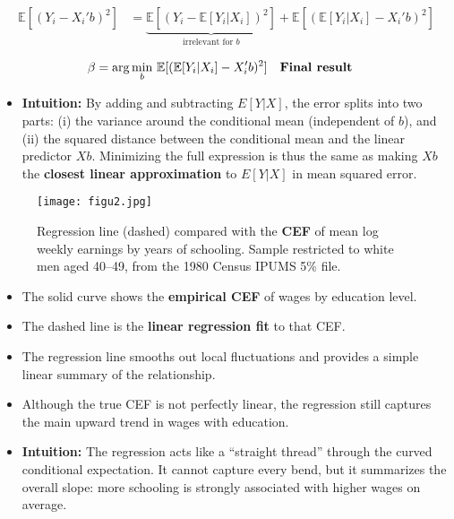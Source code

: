 \documentclass[12pt]{article}
\begin{document}
\begin{align}
\mathbb{E}[(Y_i - X_i'b)^2] 
   &= \underbrace{\mathbb{E}[(Y_i - \mathbb{E}[Y_i|X_i])^2]}_{\text{irrelevant for $b$}} 
   + \mathbb{E}[(\mathbb{E}[Y_i|X_i] - X_i'b)^2] 
\end{align}

\begin{align}
\beta &= \arg \min_b \, \mathbb{E}[(\mathbb{E}[Y_i|X_i] - X_i'b)^2] && \text{\textbf{Final result}} 
\end{align}

\begin{itemize}
    \item \textbf{Intuition:} By adding and subtracting $E[Y|X]$, the error splits into two parts:  
    (i) the variance around the conditional mean (independent of $b$), and  
    (ii) the squared distance between the conditional mean and the linear predictor $Xb$.  
    Minimizing the full expression is thus the same as making $Xb$ the \textbf{closest linear approximation} to $E[Y|X]$ in mean squared error.
\end{itemize}

\begin{figure}[H]
    \centering
    \texttt{[image: figu2.jpg]} %
    \caption*{Regression line (dashed) compared with the \textbf{CEF} of mean log weekly earnings by years of schooling. 
    Sample restricted to white men aged 40--49, from the 1980 Census IPUMS 5\% file.}
\end{figure}

\begin{itemize}
    \item The solid curve shows the \textbf{empirical CEF} of wages by education level.
    \item The dashed line is the \textbf{linear regression fit} to that CEF.
    \item The regression line smooths out local fluctuations and provides a simple linear summary of the relationship.
    \item Although the true CEF is not perfectly linear, the regression still captures the main upward trend in wages with education.
    \item \textbf{Intuition:} The regression acts like a “straight thread” through the curved conditional expectation. 
    It cannot capture every bend, but it summarizes the overall slope: more schooling is strongly associated with higher wages on average.
\end{itemize}
\end{document}
